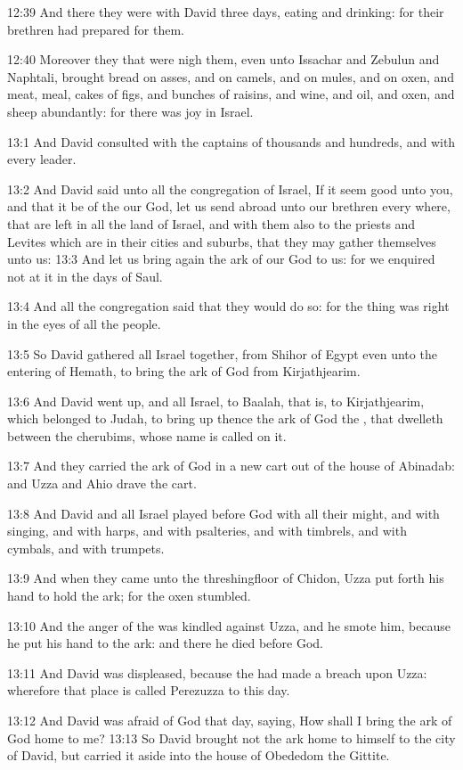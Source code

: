 12:39 And there they were with David three days, eating and drinking:
for their brethren had prepared for them.

12:40 Moreover they that were nigh them, even unto Issachar and
Zebulun and Naphtali, brought bread on asses, and on camels, and on
mules, and on oxen, and meat, meal, cakes of figs, and bunches of
raisins, and wine, and oil, and oxen, and sheep abundantly: for there
was joy in Israel.

13:1 And David consulted with the captains of thousands and hundreds,
and with every leader.

13:2 And David said unto all the congregation of Israel, If it seem
good unto you, and that it be of the \LORD our God, let us send abroad
unto our brethren every where, that are left in all the land of
Israel, and with them also to the priests and Levites which are in
their cities and suburbs, that they may gather themselves unto us:
13:3 And let us bring again the ark of our God to us: for we enquired
not at it in the days of Saul.

13:4 And all the congregation said that they would do so: for the
thing was right in the eyes of all the people.

13:5 So David gathered all Israel together, from Shihor of Egypt even
unto the entering of Hemath, to bring the ark of God from
Kirjathjearim.

13:6 And David went up, and all Israel, to Baalah, that is, to
Kirjathjearim, which belonged to Judah, to bring up thence the ark of
God the \LORD, that dwelleth between the cherubims, whose name is
called on it.

13:7 And they carried the ark of God in a new cart out of the house of
Abinadab: and Uzza and Ahio drave the cart.

13:8 And David and all Israel played before God with all their might,
and with singing, and with harps, and with psalteries, and with
timbrels, and with cymbals, and with trumpets.

13:9 And when they came unto the threshingfloor of Chidon, Uzza put
forth his hand to hold the ark; for the oxen stumbled.

13:10 And the anger of the \LORD was kindled against Uzza, and he smote
him, because he put his hand to the ark: and there he died before God.

13:11 And David was displeased, because the \LORD had made a breach
upon Uzza: wherefore that place is called Perezuzza to this day.

13:12 And David was afraid of God that day, saying, How shall I bring
the ark of God home to me?  13:13 So David brought not the ark home to
himself to the city of David, but carried it aside into the house of
Obededom the Gittite.

